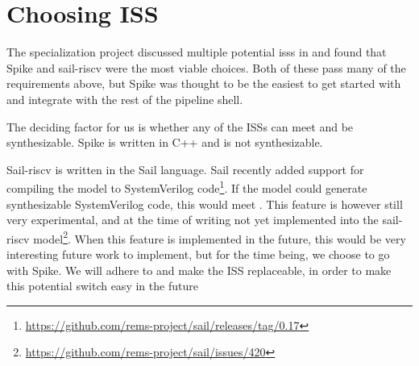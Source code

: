 
\section{Choosing ISS}

The specialization project discussed multiple potential \acrshort{iss}s in  and found that Spike \cite{SpikeRISCVISA2023} and sail-riscv \cite{RISCVSailModel2023} were the most viable choices. Both of these pass many of the requirements above, but Spike was thought to be the easiest to get started with and integrate with the rest of the pipeline shell. 

The deciding factor for us is whether any of the ISSs can meet  and be synthesizable. Spike is written in C++ and is not synthesizable. 

Sail-riscv is written in the Sail language. Sail recently added support for compiling the model to SystemVerilog code\footnote{\url{https://github.com/rems-project/sail/releases/tag/0.17}}. If the model could generate synthesizable SystemVerilog code, this would meet . This feature is however still very experimental, and at the time of writing not yet implemented into the sail-riscv model\footnote{\url{https://github.com/rems-project/sail/issues/420}}.
When this feature is implemented in the future, this would be very interesting future work to implement, but for the time being, we choose to go with Spike.
We will adhere to  and make the ISS replaceable, in order to make this potential switch easy in the future


